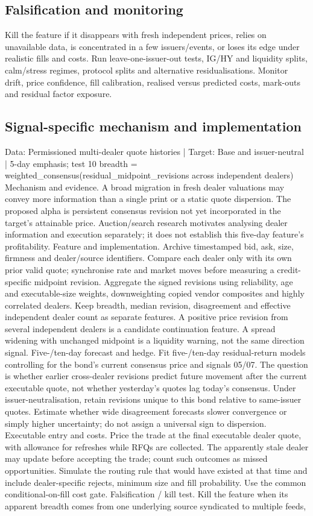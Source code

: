 \documentclass[10pt]{article}
\begin{document}
\subsection{Falsification and monitoring}
Kill the feature if it disappears with fresh independent prices, relies on unavailable data, is concentrated in a few issuers/events, or loses its edge under realistic fills and costs. Run leave-one-issuer-out tests, IG/HY and liquidity splits, calm/stress regimes, protocol splits and alternative residualisations. Monitor drift, price confidence, fill calibration, realised versus predicted costs, mark-outs and residual factor exposure.
\subsection{Signal-specific mechanism and implementation}
Data: Permissioned multi-dealer quote histories  |  Target: Base and issuer-neutral  |  5-day emphasis; test 10 breadth = weighted\_consensus(residual\_midpoint\_revisions across independent dealers) Mechanism and evidence.  A broad migration in fresh dealer valuations may convey more information than a single print or a static quote dispersion. The proposed alpha is persistent consensus revision not yet incorporated in the target’s attainable price. Auction/search research motivates analysing dealer information and execution separately; it does not establish this five-day feature’s profitability. Feature and implementation.  Archive timestamped bid, ask, size, firmness and dealer/source identifiers. Compare each dealer only with its own prior valid quote; synchronise rate and market moves before measuring a credit-specific midpoint revision. Aggregate the signed revisions using reliability, age and executable-size weights, downweighting copied vendor composites and highly correlated dealers. Keep breadth, median revision, disagreement and effective independent dealer count as separate features. A positive price revision from several independent dealers is a candidate continuation feature. A spread widening with unchanged midpoint is a liquidity warning, not the same direction signal. Five-/ten-day forecast and hedge.  Fit five-/ten-day residual-return models controlling for the bond’s current consensus price and signals 05/07. The question is whether earlier cross-dealer revisions predict future movement after the current executable quote, not whether yesterday’s quotes lag today’s consensus. Under issuer-neutralisation, retain revisions unique to this bond relative to same-issuer quotes. Estimate whether wide disagreement forecasts slower convergence or simply higher uncertainty; do not assign a universal sign to dispersion. Executable entry and costs.  Price the trade at the final executable dealer quote, with allowance for refreshes while RFQs are collected. The apparently stale dealer may update before accepting the trade; count such outcomes as missed opportunities. Simulate the routing rule that would have existed at that time and include dealer-specific rejects, minimum size and fill probability. Use the common conditional-on-fill cost gate. Falsification / kill test.  Kill the feature when its apparent breadth comes from one underlying source syndicated to multiple feeds, 
\end{document}
